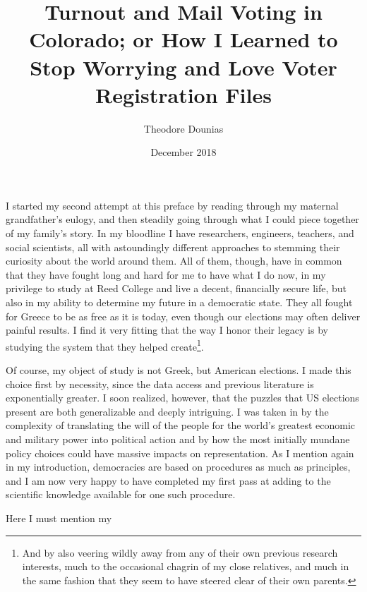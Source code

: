 \documentclass[12pt,twoside]{reedthesis}
\title{Turnout and Mail Voting in Colorado; or How I Learned to Stop Worrying
and Love Voter Registration Files}
\author{Theodore Dounias}
\date{December 2018}
\begin{document}
      \maketitle
  
  \frontmatter %
  \pagestyle{empty} %

  
      \begin{preface}
      I started my second attempt at this preface by reading through my
      maternal grandfather's eulogy, and then steadily going through what I
      could piece together of my family's story. In my bloodline I have
      researchers, engineers, teachers, and social scientists, all with
      astoundingly different approaches to stemming their curiosity about the
      world around them. All of them, though, have in common that they have
      fought long and hard for me to have what I do now, in my privilege to
      study at Reed College and live a decent, financially secure life, but
      also in my ability to determine my future in a democratic state. They
      all fought for Greece to be as free as it is today, even though our
      elections may often deliver painful results. I find it very fitting that
      the way I honor their legacy is by studying the system that they helped
      create\footnote{And by also veering wildly away from any of their own
        previous research interests, much to the occasional chagrin of my
        close relatives, and much in the same fashion that they seem to have
        steered clear of their own parents.}. \par Of course, my object of
      study is not Greek, but American elections. I made this choice first by
      necessity, since the data access and previous literature is
      exponentially greater. I soon realized, however, that the puzzles that
      US elections present are both generalizable and deeply intriguing. I was
      taken in by the complexity of translating the will of the people for the
      world's greatest economic and military power into political action and
      by how the most initially mundane policy choices could have massive
      impacts on representation. As I mention again in my introduction,
      democracies are based on procedures as much as principles, and I am now
      very happy to have completed my first pass at adding to the scientific
      knowledge available for one such procedure. \par Here I must mention my

\end{preface}
\end{document}
